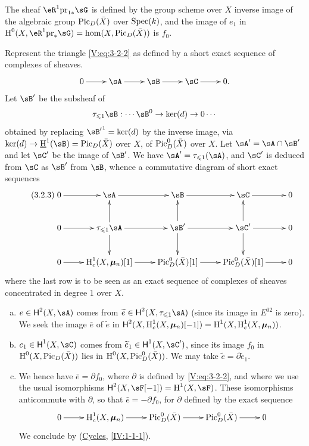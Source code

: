 The sheaf $\eR^1\pr_{1\ast}\sG$ is defined by the group scheme over
$X$ inverse image of the algebraic group $\operatorname{Pic}_D(\bar X)$ over
$\operatorname{Spec}(k)$, and the image of $e_1$ in
$\h^0(X,\eR^1\pr_\ast\sG) = \hom(X,\pic_D(\bar X))$ is $f_0$.

Represent the triangle \eqref{V:eq:3-2-2} as defined by a short
exact sequence of complexes of sheaves.
\[\xymatrix{
  0 \ar[r]
    & \sA \ar[r]
    & \sB \ar[r]
    & \sC \ar[r]
    & 0 \text{.}
}\]
Let $\sB'$ be the subsheaf of
\[
  \tau_{\leqslant 1} \sB : \cdots \sB^0 \to \ker(d) \to 0 \cdots
\]
obtained by replacing ${\sB'}^1=\ker(d)$ by the inverse image, via
$\ker(d)\to \underline\h^1(\sB) = \pic_D(\bar X)$ over $X$, of
$\operatorname{Pic}_D^0(\bar X)$ over $X$. Let $\sA'=\sA\cap \sB'$ and let $\sC'$ be the image of
$\sB'$. We have $\sA'=\tau_{\leqslant 1}(\sA)$, and $\sC'$ is deduced from $\sC$
as $\sB'$ from $\sB$, whence a commutative diagram of short exact sequences
\begin{equation*}\tag{3.2.3}\label{V:eq:3-2-3}
\xymatrix{
  0 \ar[r]
    & \sA \ar[r]
    & \sB \ar[r]
    & \sC \ar[r]
    & 0 \\
  0 \ar[r]
    & \tau_{\leqslant 1} \sA \ar[r] \ar[u] \ar[d]
    & \sB' \ar[r] \ar[u] \ar[d]
    & \sC' \ar[r] \ar[u] \ar[d]
    & 0 \\
  0 \ar[r]
    & \h_c^1(X,\dmu_n)[1] \ar[r]
    & \pic_D^0(\bar X)[1] \ar[r]
    & \pic_D^0(\bar X)[1] \ar[r]
    & 0
}
\end{equation*}
where the last row is to be seen as an exact sequence of complexes
of sheaves concentrated in degree $1$ over $X$.
\begin{enumerate}[a)]
  \item $e\in \hh^2(X,\sA)$ comes from
    $\widetilde e\in \hh^2(X,\tau_{\leqslant 1}\sA)$ (since its image in
    $E^{02}$ is zero). We seek the image $\bar e$ of $\widetilde e$ in
    $\operatorname{\mathsf{H}}^2(X,\operatorname{H}_c^1(X,{\bm\mu}_n)[-1]) = \operatorname{H}^1(X,\operatorname{H}_c^1(X,{\bm\mu}_n))$.
  \item $e_1\in \hh^1(X,\sC)$ comes from $\widetilde e_1\in \hh^1(X,\sC')$,
    since its image $f_0$ in $\operatorname{H}^0(X,\operatorname{Pic}_D(\bar X))$ lies in
    $\operatorname{H}^0(X,\operatorname{Pic}_D^0(\bar X))$. We may take
    $\widetilde e=\partial \widetilde e_1$.
  \item We hence have $\bar e = \partial f_0$, where $\partial $ is defined by
    \eqref{V:eq:3-2-2}, and where we use the usual isomorphisms
    $\hh^2(X,\sF[-1]) = \h^1(X,\sF)$. These isomorphisms anticommute with
    $\partial$, so that $\bar e=-\partial f_0$, for $\partial$ defined
    by the exact sequence
    \[\xymatrix{
      0 \ar[r]
        & \h_c^1(X,\dmu_n) \ar[r]
        & \pic_D^0(\bar X) \ar[r]
        & \pic_D^0(\bar X) \ar[r]
        & 0
    }\]
    We conclude by (\hyperref[IV]{Cycles}, \ref{IV:1-1-1}).
\end{enumerate}





